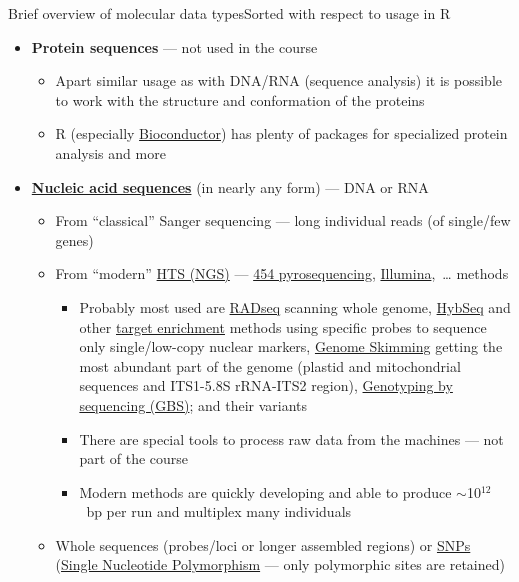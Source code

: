 \documentclass[compress, xelatex, 11pt, xcolor=svgnames, aspectratio=169, url={hyphens, lowtilde}]{beamer}
\begin{document}
\begin{frame}[allowframebreaks]{Brief overview of molecular data types}{Sorted with respect to usage in R}
\begin{itemize}
\begin{itemize}
		\end{itemize}
		\item \textbf{Protein sequences} --- not used in the course
		\begin{itemize}
			\item Apart similar usage as with DNA/RNA (sequence analysis) it is possible to work with the structure and conformation of the proteins
			\item R (especially \href{https://bioconductor.org/}{Bioconductor}) has plenty of packages for specialized protein analysis and more
		\end{itemize}
		\item \textbf{\href{https://en.wikipedia.org/wiki/Nucleic_acid_sequence}{Nucleic acid sequences}} (in nearly any form) --- DNA or RNA
		\begin{itemize}
			\item From \enquote{classical} Sanger sequencing --- long individual reads (of single/few genes)
			\item From \enquote{modern} \href{https://en.wikipedia.org/wiki/DNA_sequencing\#High-throughput_methods}{HTS (NGS)} --- \href{https://en.wikipedia.org/wiki/Pyrosequencing}{454 pyrosequencing}, \href{https://en.wikipedia.org/wiki/Illumina_dye_sequencing}{Illumina},~\ldots{ }methods
			\begin{itemize}
				\item Probably most used are \href{https://en.wikipedia.org/wiki/Restriction_site_associated_DNA_markers}{RADseq} scanning whole genome, \href{https://bsapubs.onlinelibrary.wiley.com/doi/abs/10.3732/apps.1400042}{HybSeq} and other \href{https://en.wikipedia.org/wiki/Exome_sequencing}{target enrichment} methods using specific probes to sequence only single/low-copy nuclear markers, \href{https://bsapubs.onlinelibrary.wiley.com/doi/abs/10.3732/ajb.1100335}{Genome Skimming} getting the most abundant part of the genome (plastid and mitochondrial sequences and ITS1-5.8S rRNA-ITS2 region), \href{https://en.wikipedia.org/wiki/Genotyping_by_sequencing}{Genotyping by sequencing (GBS)}; and their variants
				\item There are special tools to process raw data from the machines --- not part of the course
				\item Modern methods are quickly developing and able to produce $\sim$10$^{12}$~bp per run and multiplex many individuals
			\end{itemize}
			\item Whole sequences (probes/loci or longer assembled regions) or \href{https://en.wikipedia.org/wiki/Single-nucleotide_polymorphism}{SNPs} (\href{https://en.wikipedia.org/wiki/SNP_genotyping}{Single Nucleotide Polymorphism} --- only polymorphic sites are retained)

\end{itemize}
\end{itemize}
\end{frame}
\end{document}

